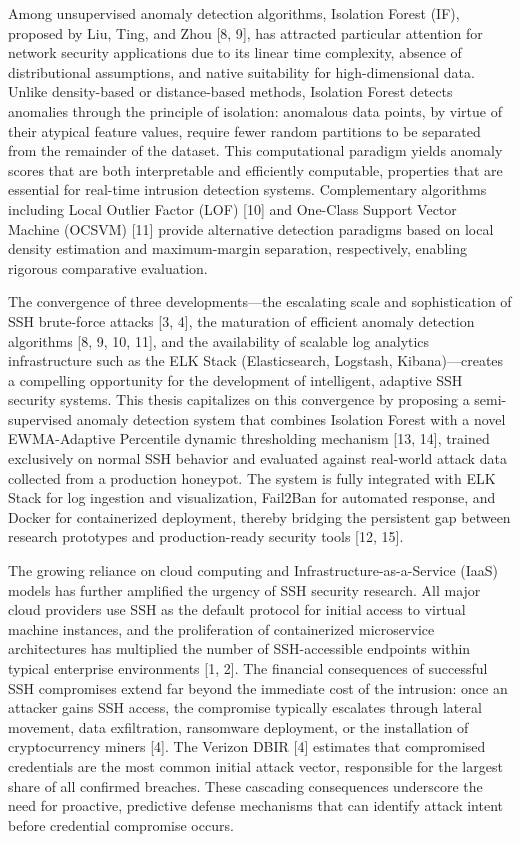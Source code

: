 \documentclass[
  a4paper]{report}
\begin{document}
Among unsupervised anomaly detection algorithms, Isolation Forest (IF),
proposed by Liu, Ting, and Zhou {[}8, 9{]}, has attracted particular
attention for network security applications due to its linear time
complexity, absence of distributional assumptions, and native
suitability for high-dimensional data. Unlike density-based or
distance-based methods, Isolation Forest detects anomalies through the
principle of isolation: anomalous data points, by virtue of their
atypical feature values, require fewer random partitions to be separated
from the remainder of the dataset. This computational paradigm yields
anomaly scores that are both interpretable and efficiently computable,
properties that are essential for real-time intrusion detection systems.
Complementary algorithms including Local Outlier Factor (LOF) {[}10{]}
and One-Class Support Vector Machine (OCSVM) {[}11{]} provide
alternative detection paradigms based on local density estimation and
maximum-margin separation, respectively, enabling rigorous comparative
evaluation.

The convergence of three developments---the escalating scale and
sophistication of SSH brute-force attacks {[}3, 4{]}, the maturation of
efficient anomaly detection algorithms {[}8, 9, 10, 11{]}, and the
availability of scalable log analytics infrastructure such as the ELK
Stack (Elasticsearch, Logstash, Kibana)---creates a compelling
opportunity for the development of intelligent, adaptive SSH security
systems. This thesis capitalizes on this convergence by proposing a
semi-supervised anomaly detection system that combines Isolation Forest
with a novel EWMA-Adaptive Percentile dynamic thresholding mechanism
{[}13, 14{]}, trained exclusively on normal SSH behavior and evaluated
against real-world attack data collected from a production honeypot. The
system is fully integrated with ELK Stack for log ingestion and
visualization, Fail2Ban for automated response, and Docker for
containerized deployment, thereby bridging the persistent gap between
research prototypes and production-ready security tools {[}12, 15{]}.

The growing reliance on cloud computing and Infrastructure-as-a-Service
(IaaS) models has further amplified the urgency of SSH security
research. All major cloud providers use SSH as the default protocol for
initial access to virtual machine instances, and the proliferation of
containerized microservice architectures has multiplied the number of
SSH-accessible endpoints within typical enterprise environments {[}1,
2{]}. The financial consequences of successful SSH compromises extend
far beyond the immediate cost of the intrusion: once an attacker gains
SSH access, the compromise typically escalates through lateral movement,
data exfiltration, ransomware deployment, or the installation of
cryptocurrency miners {[}4{]}. The Verizon DBIR {[}4{]} estimates that
compromised credentials are the most common initial attack vector,
responsible for the largest share of all confirmed breaches. These
cascading consequences underscore the need for proactive, predictive
defense mechanisms that can identify attack intent before credential
compromise occurs.
\end{document}
